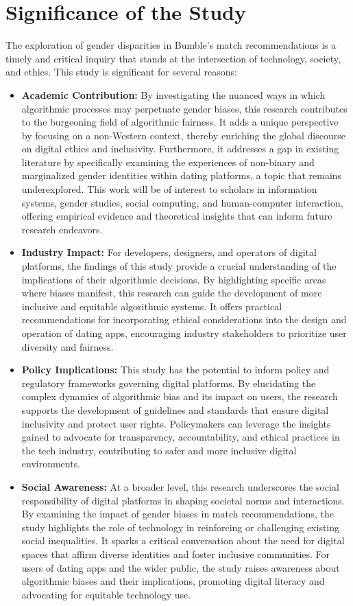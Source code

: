 \section{Significance of the Study}
The exploration of gender disparities in Bumble’s match recommendations is a timely and critical inquiry that stands at the intersection of technology, society, and ethics. This study is significant for several reasons:

\begin{itemize}
    \item \textbf{Academic Contribution:} By investigating the nuanced ways in which algorithmic processes may perpetuate gender biases, this research contributes to the burgeoning field of algorithmic fairness. It adds a unique perspective by focusing on a non-Western context, thereby enriching the global discourse on digital ethics and inclusivity. Furthermore, it addresses a gap in existing literature by specifically examining the experiences of non-binary and marginalized gender identities within dating platforms, a topic that remains underexplored. This work will be of interest to scholars in information systems, gender studies, social computing, and human-computer interaction, offering empirical evidence and theoretical insights that can inform future research endeavors.
    \item \textbf{Industry Impact:} For developers, designers, and operators of digital platforms, the findings of this study provide a crucial understanding of the implications of their algorithmic decisions. By highlighting specific areas where biases manifest, this research can guide the development of more inclusive and equitable algorithmic systems. It offers practical recommendations for incorporating ethical considerations into the design and operation of dating apps, encouraging industry stakeholders to prioritize user diversity and fairness.
    \item \textbf{Policy Implications:} This study has the potential to inform policy and regulatory frameworks governing digital platforms. By elucidating the complex dynamics of algorithmic bias and its impact on users, the research supports the development of guidelines and standards that ensure digital inclusivity and protect user rights. Policymakers can leverage the insights gained to advocate for transparency, accountability, and ethical practices in the tech industry, contributing to safer and more inclusive digital environments.
    \item \textbf{Social Awareness:} At a broader level, this research underscores the social responsibility of digital platforms in shaping societal norms and interactions. By examining the impact of gender biases in match recommendations, the study highlights the role of technology in reinforcing or challenging existing social inequalities. It sparks a critical conversation about the need for digital spaces that affirm diverse identities and foster inclusive communities. For users of dating apps and the wider public, the study raises awareness about algorithmic biases and their implications, promoting digital literacy and advocating for equitable technology use.

\end{itemize}
